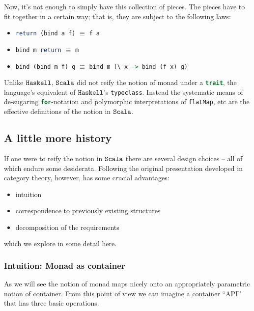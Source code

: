 Now, it's not enough to simply have this collection of pieces. The
pieces have to fit together in a certain way; that is, they are
subject to the following laws:

\begin{itemize}
  \item \lstinline[language=Haskell]!return (bind a f)! $\equiv$ \lstinline[language=Haskell]!f a! %
  \item \lstinline[language=Haskell]!bind m return! $\equiv$ \lstinline[language=Haskell]!m! %
  \item \lstinline[language=Haskell]!bind (bind m f) g! $\equiv$ \lstinline[language=Haskell]!bind m (\ x -> bind (f x) g)! %
\end{itemize}

Unlike $\texttt{Haskell}$, $\texttt{Scala}$ did not reify the notion of monad under a
\lstinline[language=Scala]!trait!, the language's equivalent of
$\texttt{Haskell}$'s \lstinline[language=Haskell]!typeclass!. Instead the
systematic means of de-sugaring
\lstinline[language=Scala]!for!-notation and polymorphic
interpretations of \lstinline[language=Scala]!flatMap!, etc are the
effective definitions of the notion in $\texttt{Scala}$.

\subsection{A little more history}

If one were to reify the notion in $\texttt{Scala}$ there are several design
choices -- all of which endure some desiderata. Following the original
presentation developed in category theory, however, has some crucial
advantages:

\begin{itemize}
  \item intuition
  \item correspondence to previously existing structures
  \item decomposition of the requirements 
\end{itemize}

which we explore in some detail here.

\subsubsection{Intuition: Monad as container}

As we will see the notion of monad maps nicely onto an appropriately
parametric notion of container. From this point of view we can imagine
a container ``API'' that has three basic operations. 
